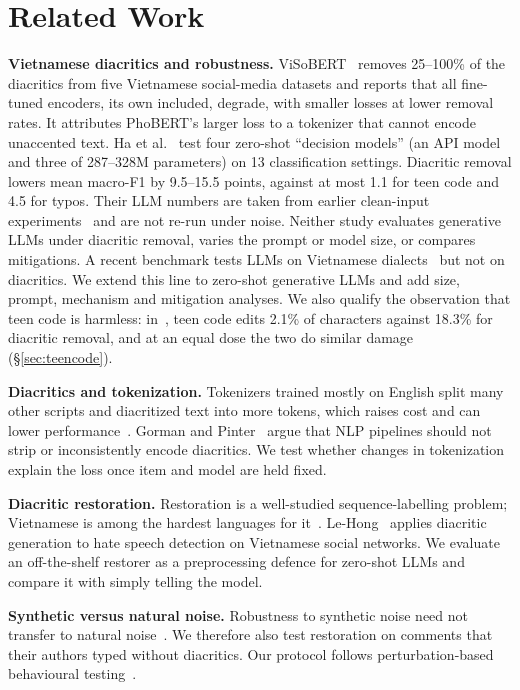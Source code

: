 \documentclass[conference]{IEEEtran}
\begin{document}
\section{Related Work}

\textbf{Vietnamese diacritics and robustness.}
ViSoBERT~\cite{nguyen2023visobert} removes 25--100\% of the diacritics from five Vietnamese social-media datasets and reports that all fine-tuned encoders, its own included, degrade, with smaller losses at lower removal rates. It attributes PhoBERT's larger loss to a tokenizer that cannot encode unaccented text. Ha et al.~\cite{ha2026decision} test four zero-shot ``decision models'' (an API model and three of 287--328M parameters) on 13 classification settings. Diacritic removal lowers mean macro-F1 by 9.5--15.5 points, against at most 1.1 for teen code and 4.5 for typos. Their LLM numbers are taken from earlier clean-input experiments~\cite{thin2024prompt} and are not re-run under noise. Neither study evaluates generative LLMs under diacritic removal, varies the prompt or model size, or compares mitigations. A recent benchmark tests LLMs on Vietnamese dialects~\cite{tran2026dialects} but not on diacritics. We extend this line to zero-shot generative LLMs and add size, prompt, mechanism and mitigation analyses. We also qualify the observation that teen code is harmless: in~\cite{ha2026decision}, teen code edits 2.1\% of characters against 18.3\% for diacritic removal, and at an equal dose the two do similar damage (\S\ref{sec:teencode}).

\textbf{Diacritics and tokenization.}
Tokenizers trained mostly on English split many other scripts and diacritized text into more tokens, which raises cost and can lower performance~\cite{rust2021tokenizer,petrov2023tokenizers}. Gorman and Pinter~\cite{gorman2024diacritics} argue that NLP pipelines should not strip or inconsistently encode diacritics. We test whether changes in tokenization explain the loss once item and model are held fixed.

\textbf{Diacritic restoration.}
Restoration is a well-studied sequence-labelling problem; Vietnamese is among the hardest languages for it~\cite{naplava2018diacritics}. Le-Hong~\cite{lehong2021diacritics} applies diacritic generation to hate speech detection on Vietnamese social networks. We evaluate an off-the-shelf restorer as a preprocessing defence for zero-shot LLMs and compare it with simply telling the model.

\textbf{Synthetic versus natural noise.}
Robustness to synthetic noise need not transfer to natural noise~\cite{belinkov2018noise}. We therefore also test restoration on comments that their authors typed without diacritics. Our protocol follows perturbation-based behavioural testing~\cite{ribeiro2020checklist}.
\end{document}
